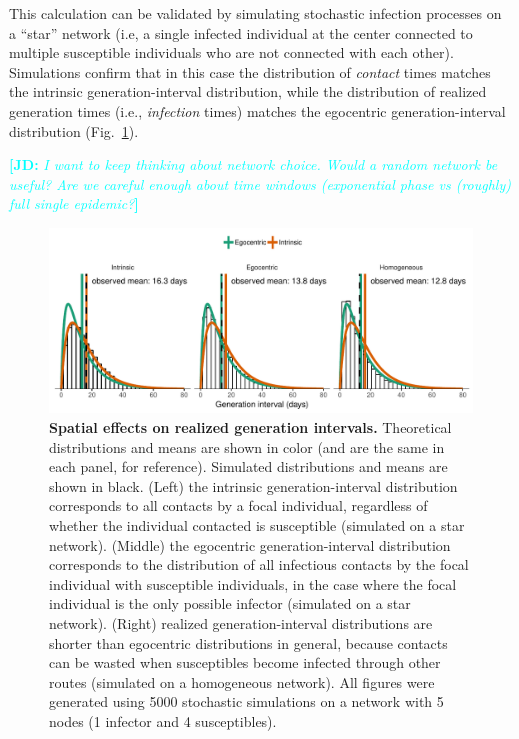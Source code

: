 \documentclass[12pt]{article}
\newcommand{\fref}[1]{Fig.~\ref{fig:#1}}
\newcommand{\comment}[3]{\textcolor{#1}{\textbf{[#2: }\textsl{#3}\textbf{]}}}
\newcommand{\jd}[1]{\comment{cyan}{JD}{#1}}
\begin{document}
This calculation can be validated by simulating stochastic infection processes on a ``star'' network (i.e, a single infected individual at the center connected to multiple susceptible individuals who are not connected with each other).
Simulations confirm that in this case the distribution of \emph{contact} times matches the intrinsic generation-interval distribution, while the distribution of realized generation times (i.e., \emph{infection} times) matches the egocentric generation-interval distribution (\fref{local}).

\jd{I want to keep thinking about network choice. Would a random network be useful? Are we careful enough about time windows (exponential phase vs (roughly) full single epidemic?}
\begin{figure}[!pbth]
\includegraphics[width=\textwidth]{../fig/local_effect.pdf}
\caption{
\textbf{Spatial effects on realized generation intervals.}
Theoretical distributions and means are shown in color (and are the same in each panel, for reference). Simulated distributions and means are shown in black.
(Left) the intrinsic generation-interval distribution corresponds to all contacts by a focal individual, regardless of whether the individual contacted is susceptible (simulated on a star network).
(Middle) the egocentric generation-interval distribution corresponds to the distribution of all infectious contacts by the focal individual with susceptible individuals, in the case where the focal individual is the only possible infector (simulated on a star network).
(Right) realized generation-interval distributions are shorter than egocentric distributions in general, because contacts can be wasted when susceptibles become infected through other routes (simulated on a homogeneous network).
All figures were generated using 5000 stochastic simulations on a network with 5 nodes (1 infector and 4 susceptibles).
}
\label{fig:local}
\end{figure}
\end{document}
